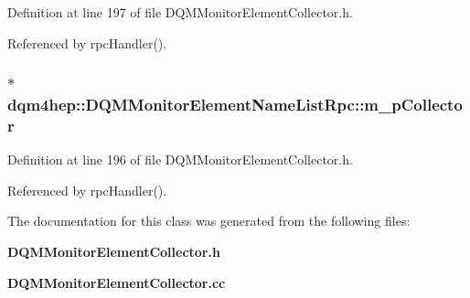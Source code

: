 Definition at line 197 of file D\+Q\+M\+Monitor\+Element\+Collector.\+h.



Referenced by rpc\+Handler().

\subsubsection[{m\+\_\+p\+Collector}]{$\ast$ dqm4hep\+::\+D\+Q\+M\+Monitor\+Element\+Name\+List\+Rpc\+::m\+\_\+p\+Collector\hspace{0.3cm}{\ttfamily [private]}}\label{classdqm4hep_1_1DQMMonitorElementNameListRpc_ae64f3e1466222ec0de79885bd850b14d}


Definition at line 196 of file D\+Q\+M\+Monitor\+Element\+Collector.\+h.



Referenced by rpc\+Handler().



The documentation for this class was generated from the following files\+:\begin{DoxyCompactItemize}
\item 
{\bf D\+Q\+M\+Monitor\+Element\+Collector.\+h}\item 
{\bf D\+Q\+M\+Monitor\+Element\+Collector.\+cc}\end{DoxyCompactItemize}
